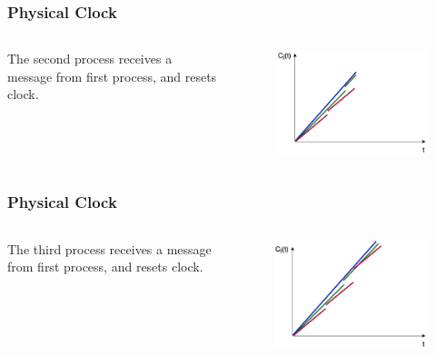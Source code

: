 \documentclass{beamer}
\begin{document}
\frame
{
  \frametitle{Physical Clock}
	\begin{columns}
	\begin{column}{0.6\textwidth}
		The second process receives a message from first process, and resets clock.
	\end{column}
	\begin{column}{0.4\textwidth}

		\begin{figure}[ht!]
		\includegraphics[width=\textwidth]{files/ClockDist-Physical-Clock-3.png}
		\end{figure}

	\end{column}
	\end{columns}
}

\frame
{
  \frametitle{Physical Clock}
	\begin{columns}
	\begin{column}{0.6\textwidth}
		The third process receives a message from first process, and resets clock.
	\end{column}
	\begin{column}{0.4\textwidth}

		\begin{figure}[ht!]
		\includegraphics[width=\textwidth]{files/ClockDist-Physical-Clock-4.png}
		\end{figure}

	\end{column}
	\end{columns}
}
\end{document}

